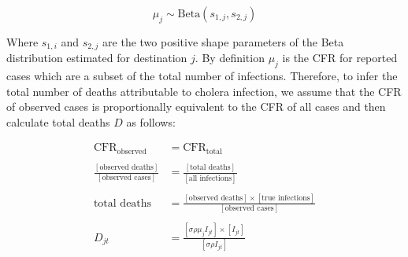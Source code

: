 \documentclass[
]{book}
\begin{document}
\[
\mu_j \sim \text{Beta}(s_{1,j}, s_{2,j})
\]

Where \(s_{1,i}\) and \(s_{2,j}\) are the two positive shape parameters of the Beta distribution estimated for destination \(j\). By definition \(\mu_j\) is the CFR for reported cases which are a subset of the total number of infections. Therefore, to infer the total number of deaths attributable to cholera infection, we assume that the CFR of observed cases is proportionally equivalent to the CFR of all cases and then calculate total deaths \(D\) as follows:

\begin{equation}
\begin{aligned}
\text{CFR}_{\text{observed}} &= \text{CFR}_{\text{total}}\\
\\[3pt]
\frac{[\text{observed deaths}]}{[\text{observed cases}]} &= 
\frac{[\text{total deaths}]}{[\text{all infections}]}\\
\\[3pt]
\text{total deaths} &= \frac{[\text{observed deaths}] \times [\text{true infections}]}{[\text{observed cases}]}\\
\\[3pt]
D_{jt} &= \frac{ [\sigma\rho\mu_j I_{jt}] \times [I_{jt}] }{ [\sigma\rho I_{jt}] }
\end{aligned}
\label{eq:deaths}
\end{equation}
\end{document}
